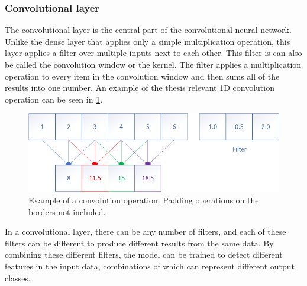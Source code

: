 \subsubsection{Convolutional layer}
The convolutional layer is the central part of the convolutional neural network.
Unlike the dense layer that applies only a simple multiplication operation, this layer applies a filter over multiple inputs next to each other. 
This filter is can also be called the convolution window or the kernel.
The filter applies a multiplication operation to every item in the convolution window and then sums all of the results into one number.
An example of the thesis relevant 1D convolution operation can be seen in \cref{fig:conv_example}.

\begin{figure}[htbp]  %
  \centering
  \includegraphics[width=.8\textwidth]{figures/conv_op.png}
  \caption{Example of a convolution operation. Padding operations on the borders not included.}
  \label{fig:conv_example}
\end{figure}

In a convolutional layer, there can be any number of filters, and each of these filters can be different to produce different results from the same data.
By combining these different filters, the model can be trained to detect different features in the input data, combinations of which can represent different output classes.



